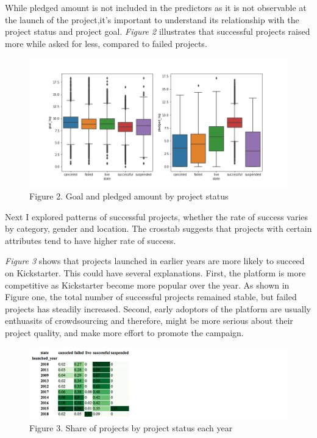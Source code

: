 \documentclass[11pt]{article}
\makeatletter
\def\maxwidth{\ifdim\Gin@nat@width>\linewidth\linewidth
    \else\Gin@nat@width\fi}
\let\Oldincludegraphics\includegraphics
\renewcommand{\includegraphics}[1]{\Oldincludegraphics[width=.8\maxwidth]{#1}}
\makeatother
\begin{document}
While pledged amount is not included in the predictors as it is not
observable at the launch of the project,it's important to understand its
relationship with the project status and project goal. \emph{Figure 2}
illustrates that successful projects raised more while asked for less,
compared to failed projects.

\begin{figure}
\centering
\includegraphics{plots/goal_status.png}
\caption{Figure 2. Goal and pledged amount by project status}
\end{figure}

Next I explored patterns of successful projects, whether the rate of
success varies by category, gender and location. The crosstab suggests
that projects with certain attributes tend to have higher rate of
success.

\emph{Figure 3} shows that projects launched in earlier years are more
likely to succeed on Kickstarter. This could have several explanations.
First, the platform is more competitive as Kickstarter become more
popular over the year. As shown in Figure one, the total number of
successful projects remained stable, but failed projects has steadily
increased. Second, early adoptors of the platform are usually enthuasits
of crowdsourcing and therefore, might be more serious about their
project quality, and make more effort to promote the campaign.

\begin{figure}
\centering
\includegraphics{plots/year_table.png}
\caption{Figure 3. Share of projects by project status each year}
\end{figure}
\end{document}
